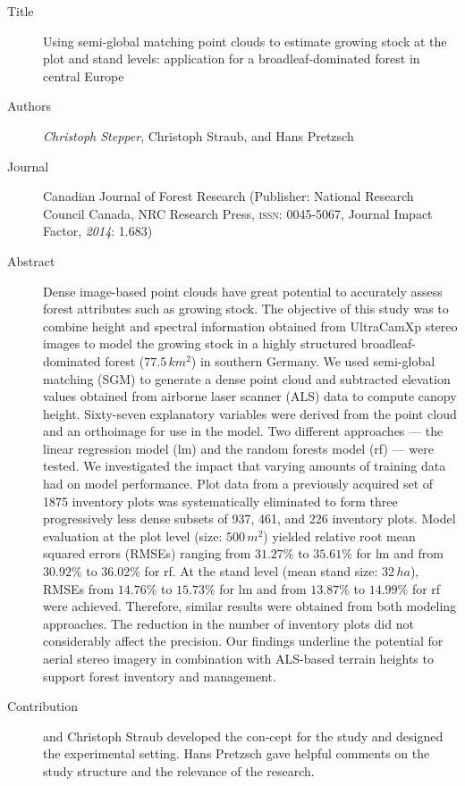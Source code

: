 \begin{description}
	\item[Title] Using semi-global matching point clouds to estimate growing stock at the plot and stand levels: 
		application for a broadleaf-dominated forest in central Europe
	\item[Authors] \emph{Christoph Stepper}, Christoph Straub, and Hans Pretzsch
	\item[Journal] Canadian Journal of Forest Research (Publisher: National Research Council Canada, NRC Research Press, \textsc{issn}: 0045-5067, 
		Journal Impact Factor, \emph{2014}: 1.683)
	\item[Abstract] Dense image-based point clouds have great potential to accurately assess forest attributes such as growing stock. The
		objective of this study was to combine height and spectral information obtained from UltraCamXp stereo images to model the
		growing stock in a highly structured broadleaf-dominated forest ($77.5\,km^2$) in southern Germany. We used semi-global matching
		(SGM) to generate a dense point cloud and subtracted elevation values obtained from airborne laser scanner (ALS) data to
		compute canopy height. Sixty-seven explanatory variables were derived from the point cloud and an orthoimage for use in the
		model. Two different approaches --- the linear regression model (lm) and the random forests model (rf) --- were tested. We
		investigated the impact that varying amounts of training data had on model performance. Plot data from a previously acquired
		set of 1875 inventory plots was systematically eliminated to form three progressively less dense subsets of 937, 461, and
		226 inventory plots. Model evaluation at the plot level (size: $500\,m^2$) yielded relative root mean squared errors (RMSEs)
		ranging from $31.27\%$ to $35.61\%$ for lm and from $30.92\%$ to $36.02\%$ for rf. At the stand level (mean stand size: $32\,ha$), RMSEs
		from $14.76\%$ to $15.73\%$ for lm and from $13.87\%$ to $14.99\%$ for rf were achieved. Therefore, similar results were obtained 
		from both modeling approaches. The reduction in the number of inventory plots did not considerably affect the precision. 
		Our findings underline the potential for aerial stereo imagery in combination with ALS-based terrain heights to support forest inventory and management.
	\item[Contribution] \myName and Christoph Straub developed the con-cept for the study and \myName designed the experimental setting. 
		Hans Pretzsch gave helpful comments on the study structure and the relevance of the research.
	

\end{description}
